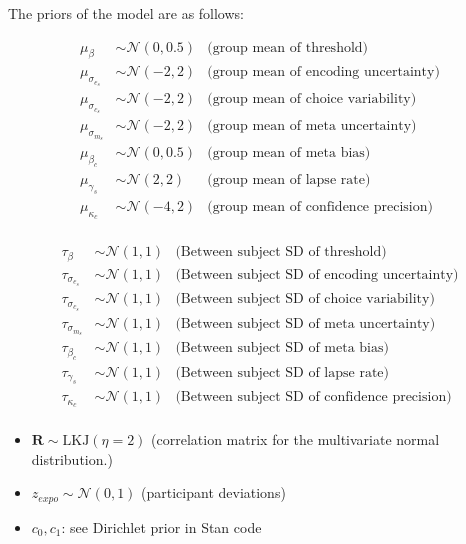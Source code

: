 \documentclass[
]{article}
\providecommand{\tightlist}{%
  \setlength{\itemsep}{0pt}\setlength{\parskip}{0pt}}
\begin{document}
The priors of the model are as follows:

\[
\begin{aligned}
\mu_{\beta} &\sim \mathcal{N}(0, 0.5) & \text{(group mean of threshold)} \\
\mu_{\sigma_{e_s}} &\sim \mathcal{N}(-2, 2) & \text{(group mean of encoding uncertainty)} \\
\mu_{\sigma_{c_s}} &\sim \mathcal{N}(-2, 2) & \text{(group mean of choice variability)} \\
\mu_{\sigma_{m_s}} &\sim \mathcal{N}(-2, 2) & \text{(group mean of meta uncertainty)} \\
\mu_{\beta_c} &\sim \mathcal{N}(0, 0.5) & \text{(group mean of meta bias)} \\
\mu_{\gamma_s} &\sim \mathcal{N}(2, 2) & \text{(group mean of lapse rate)} \\
\mu_{\kappa_c} &\sim \mathcal{N}(-4, 2) & \text{(group mean of confidence precision)} \\
\end{aligned}
\]

\[
\begin{aligned}
\tau_{\beta} &\sim \mathcal{N}(1, 1) & \text{(Between subject SD of threshold)} \\
\tau_{\sigma_{e_s}} &\sim \mathcal{N}(1, 1) & \text{(Between subject SD of encoding uncertainty)} \\
\tau_{\sigma_{c_s}} &\sim \mathcal{N}(1, 1) & \text{(Between subject SD of choice variability)} \\
\tau_{\sigma_{m_s}} &\sim \mathcal{N}(1, 1) & \text{(Between subject SD of meta uncertainty)} \\
\tau_{\beta_c} &\sim \mathcal{N}(1, 1) & \text{(Between subject SD of meta bias)} \\
\tau_{\gamma_s} &\sim \mathcal{N}(1, 1) & \text{(Between subject SD of lapse rate)} \\
\tau_{\kappa_c} &\sim \mathcal{N}(1, 1) & \text{(Between subject SD of confidence precision)} \\
\end{aligned}
\]

\begin{itemize}
\tightlist
\item
  \(\mathbf{R} \sim \mathrm{LKJ}(\eta = 2)\) (correlation matrix for the
  multivariate normal distribution.)
\item
  \(z_{expo} \sim \mathcal{N}(0, 1)\) (participant deviations)
\item
  \(c_0, c_{1}\): see Dirichlet prior in Stan code
\end{itemize}
\end{document}
